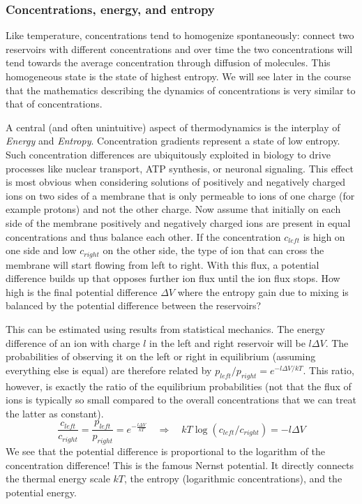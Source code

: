\subsubsection{Concentrations, energy, and entropy}
Like temperature, concentrations tend to homogenize spontaneously: connect two reservoirs with different concentrations and over time the two concentrations will tend towards the average concentration through diffusion of molecules.
This homogeneous state is the state of highest entropy.
We will see later in the course that the mathematics describing the dynamics of concentrations is very similar to that of concentrations.

A central (and often unintuitive) aspect of thermodynamics is the interplay of \emph{Energy} and \emph{Entropy}.
Concentration gradients represent a state of low entropy.
Such concentration differences are ubiquitously exploited in biology to drive processes like nuclear transport, ATP synthesis, or neuronal signaling.
This effect is most obvious when considering solutions of positively and negatively charged ions on two sides of a membrane that is only permeable to ions of one charge (for example protons) and not the other charge.
Now assume that initially on each side of the membrane positively and negatively charged ions are present in equal concentrations and thus balance each other.
If the concentration $c_{left}$ is high on one side and low $c_{right}$ on the other side, the type of ion that can cross the membrane will start flowing from left to right.
With this flux, a potential difference builds up that opposes further ion flux until the ion flux stops.
How high is the final potential difference $\Delta V$ where the entropy gain due to mixing is balanced by the potential difference between the reservoirs?

This can be estimated using results from statistical mechanics.
The energy difference of an ion with charge $l$ in the left and right reservoir will be $l\Delta V$.
The probabilities of observing it on the left or right in equilibrium (assuming everything else is equal) are therefore related by $p_{left}/p_{right} = e^{-l\Delta V/kT}$.
This ratio, however, is exactly the ratio of the equilibrium probabilities (not that the flux of ions is typically so small compared to the overall concentrations that we can treat the latter as constant).
\begin{equation}
	\frac{c_{left}}{c_{right}} = \frac{p_{left}}{p_{right}} = e^{-\frac{l\Delta V}{kT}} \quad \Rightarrow \quad kT \log(c_{left}/c_{right})  = - l\Delta V
\end{equation}
We see that the potential difference is proportional to the logarithm of the concentration difference!
This is the famous Nernst potential.
It directly connects the thermal energy scale $kT$, the entropy (logarithmic concentrations), and the potential energy.

